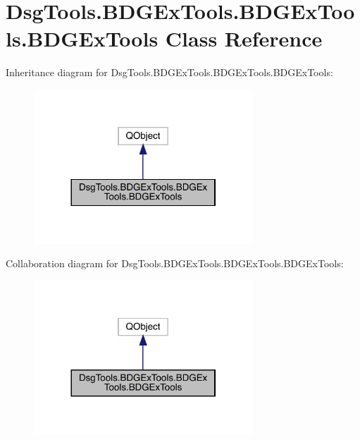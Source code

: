\hypertarget{class_dsg_tools_1_1_b_d_g_ex_tools_1_1_b_d_g_ex_tools_1_1_b_d_g_ex_tools}{}\section{Dsg\+Tools.\+B\+D\+G\+Ex\+Tools.\+B\+D\+G\+Ex\+Tools.\+B\+D\+G\+Ex\+Tools Class Reference}
\label{class_dsg_tools_1_1_b_d_g_ex_tools_1_1_b_d_g_ex_tools_1_1_b_d_g_ex_tools}


Inheritance diagram for Dsg\+Tools.\+B\+D\+G\+Ex\+Tools.\+B\+D\+G\+Ex\+Tools.\+B\+D\+G\+Ex\+Tools\+:
\nopagebreak
\begin{figure}[H]
\begin{center}
\leavevmode
\includegraphics[width=233pt]{class_dsg_tools_1_1_b_d_g_ex_tools_1_1_b_d_g_ex_tools_1_1_b_d_g_ex_tools__inherit__graph}
\end{center}
\end{figure}


Collaboration diagram for Dsg\+Tools.\+B\+D\+G\+Ex\+Tools.\+B\+D\+G\+Ex\+Tools.\+B\+D\+G\+Ex\+Tools\+:
\nopagebreak
\begin{figure}[H]
\begin{center}
\leavevmode
\includegraphics[width=233pt]{class_dsg_tools_1_1_b_d_g_ex_tools_1_1_b_d_g_ex_tools_1_1_b_d_g_ex_tools__coll__graph}
\end{center}
\end{figure}
